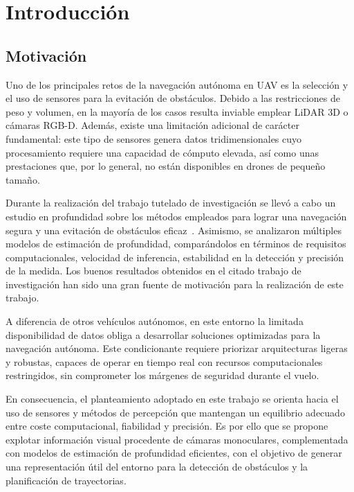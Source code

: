 \chapter{Introducción}

\section{Motivación}
    Uno de los principales retos de la navegación autónoma en UAV es la selección y el uso de sensores para la evitación de obstáculos. 
    Debido a las restricciones de peso y volumen, en la mayoría de los casos resulta inviable emplear LiDAR 3D o cámaras RGB-D. Además, 
    existe una limitación adicional de carácter fundamental: este tipo de sensores genera datos tridimensionales cuyo procesamiento 
    requiere una capacidad de cómputo elevada, así como unas prestaciones que, por lo general, no están disponibles en drones de pequeño 
    tamaño.

    Durante la realización del trabajo tutelado de investigación se llevó a cabo un estudio en profundidad sobre los métodos empleados 
    para lograr una navegación segura y una evitación de obstáculos eficaz~\cite{estudio-nav2D}. Asimismo, se analizaron múltiples modelos 
    de estimación de profundidad, comparándolos en términos de requisitos computacionales, velocidad de inferencia, estabilidad en la 
    detección y precisión de la medida. Los buenos resultados obtenidos en el citado trabajo de investigación han sido una gran fuente 
    de motivación para la realización de este trabajo.

    
    A diferencia de otros vehículos autónomos, en este entorno la limitada disponibilidad de datos obliga a desarrollar soluciones optimizadas para la 
    navegación autónoma. Este condicionante requiere priorizar arquitecturas ligeras y robustas, capaces de operar en tiempo real con 
    recursos computacionales restringidos, sin comprometer los márgenes de seguridad durante el vuelo.

    En consecuencia, el planteamiento adoptado en este trabajo se orienta hacia el uso de sensores y métodos de percepción que mantengan 
    un equilibrio adecuado entre coste computacional, fiabilidad y precisión. Es por ello que se propone explotar información visual 
    procedente de cámaras monoculares, complementada con modelos de estimación de profundidad eficientes, con el objetivo de generar 
    una representación útil del entorno para la detección de obstáculos y la planificación de trayectorias.

